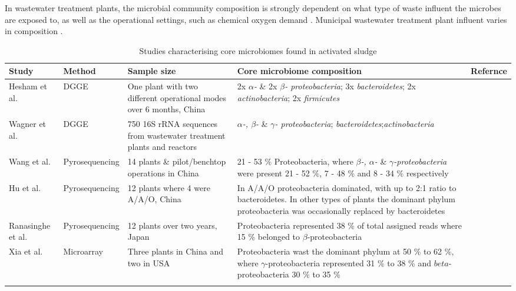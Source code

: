 \documentclass[11pt]{article}
\begin{document}
In wastewater treatment plants, the microbial community composition is strongly dependent on what type of waste influent the microbes are exposed to, as well as the operational settings, such as chemical oxygen demand \cite{Gilbride_06,wang2012pyrosequencing,hu2012microbial}. Municipal wastewater treatment plant influent varies in composition \citep{henze2002wastewater}.


\begin{sidewaystable}[!htbp]
\begin{tabular}{ | l | l | p{4.5cm} | p{7cm} | l | }
\hline
Study & Method & Sample size & Core microbiome composition & Refernce\\
\hline
Hesham et al. & DGGE & One plant with two different operational modes over 6 months, China & 2x \emph{$\alpha$-} \& 2x \emph{$\beta$- proteobacteria}; 3x \emph{bacteroidetes}; 2x \emph{actinobacteria}; 2x \emph{firmicutes} & \cite{Hesham_11} \\
\hline
Wagner et al. & DGGE & 750 16S rRNA sequences from wastewater treatment plants and reactors & \emph{$\alpha$-, $\beta$-} \& \emph{$\gamma$- proteobacteria}; \emph{bacteroidetes};\emph{actinobacteria} & \cite{Wagner_02} \\
\hline
Wang et al. & Pyrosequencing & 14 plants \& pilot/benchtop operations in China & 21 - 53 \% Proteobacteria, where \emph{$\beta$-, $\alpha$-} \& \emph{$\gamma$-proteobacteria} were present 21 - 52 \%, 7 - 48 \% and 8 - 34 \% respectively & \cite{wang2012pyrosequencing} \\
\hline
Hu et al. & Pyrosequencing & 12 plants where 4 were A/A/O, China & In A/A/O proteobacteria dominated, with up to 2:1 ratio to bacteroidetes. In other types of plants the dominant phylum proteobacteria was occasionally replaced by bacteroidetes & \cite{hu2012microbial} \\
\hline
Ranasinghe et al. & Pyrosequencing & 12 plants over two years, Japan & Proteobacteria represented 38 \% of total assigned reads where 15 \% belonged to $\beta$-proteobacteria & \cite{ranasinghe2012revealing} \\
\hline
Xia et al. & Microarray & Three plants in China and two in USA & Proteobacteria wast the dominant phylum at 50 \% to 62 \%, where $\gamma$-proteobacteria represented  31 \% to 38 \% and $beta$-proteobacteria 30 \% to 35 \% & \cite{xia2010bacterial} \\
\hline
 & & & & \\
\hline
\end{tabular}
\caption{Studies characterising core microbiomes found in activated sludge}
\end{sidewaystable}
\end{document}
